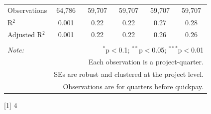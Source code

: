 \documentclass[
]{article}
\begin{document}
\begin{table}[H]
\begin{tabular}{@{\extracolsep{-2pt}}lccccc}
Observations & 64,786 & 59,707 & 59,707 & 59,707 & 59,707 \\ 
R$^{2}$ & 0.001 & 0.22 & 0.22 & 0.27 & 0.28 \\ 
Adjusted R$^{2}$ & 0.001 & 0.22 & 0.22 & 0.26 & 0.26 \\ 
\hline 
\hline \\[-1.8ex] 
\textit{Note:}  & \multicolumn{5}{r}{$^{*}$p$<$0.1; $^{**}$p$<$0.05; $^{***}$p$<$0.01} \\ 
 & \multicolumn{5}{r}{Each observation is a project-quarter.} \\ 
 & \multicolumn{5}{r}{SEs are robust and clustered at the project level.} \\ 
 & \multicolumn{5}{r}{Observations are for quarters before quickpay.} \\ 
\end{tabular} 
\end{table}

{[}1{]} 4
\end{document}
